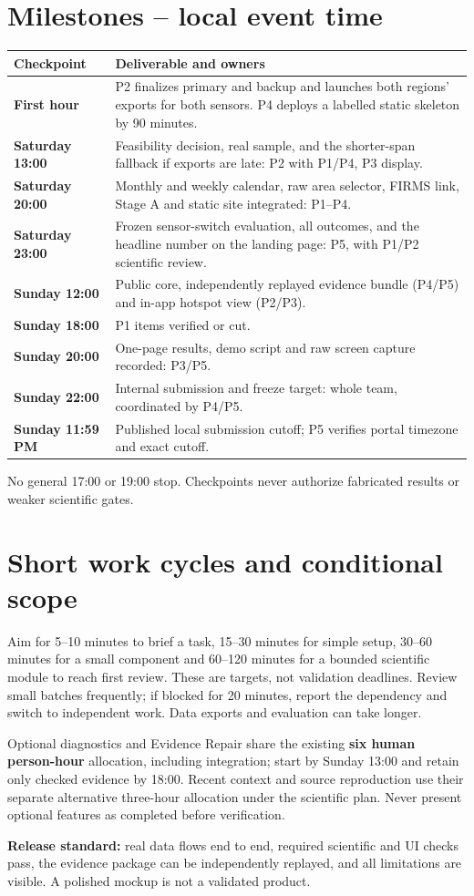 \documentclass[10pt]{article}
\begin{document}
\section*{Milestones -- local event time}
\begin{longtable}{@{}>{\RaggedRight\arraybackslash}p{3.5cm} >{\RaggedRight\arraybackslash}p{12cm}@{}}
\rowcolor{blue!12}\textbf{Checkpoint} & \textbf{Deliverable and owners} \\
\toprule
\textbf{First hour} & P2 finalizes primary and backup and launches both regions' exports for both sensors. P4 deploys a labelled static skeleton by 90 minutes.\\
\textbf{Saturday 13:00} & Feasibility decision, real sample, and the shorter-span fallback if exports are late: P2 with P1/P4, P3 display.\\
\textbf{Saturday 20:00} & Monthly and weekly calendar, raw area selector, FIRMS link, Stage A and static site integrated: P1--P4.\\
\textbf{Saturday 23:00} & Frozen sensor-switch evaluation, all outcomes, and the headline number on the landing page: P5, with P1/P2 scientific review.\\
\textbf{Sunday 12:00} & Public core, independently replayed evidence bundle (P4/P5) and in-app hotspot view (P2/P3).\\
\textbf{Sunday 18:00} & P1 items verified or cut.\\
\textbf{Sunday 20:00} & One-page results, demo script and raw screen capture recorded: P3/P5.\\
\textbf{Sunday 22:00} & Internal submission and freeze target: whole team, coordinated by P4/P5.\\
\textbf{Sunday 11:59 PM} & Published local submission cutoff; P5 verifies portal timezone and exact cutoff.\\
\end{longtable}
No general 17:00 or 19:00 stop. Checkpoints never authorize fabricated results or weaker scientific gates.

\section*{Short work cycles and conditional scope}
Aim for 5--10 minutes to brief a task, 15--30 minutes for simple setup, 30--60 minutes for a small component and 60--120 minutes for a bounded scientific module to reach first review. These are targets, not validation deadlines. Review small batches frequently; if blocked for 20 minutes, report the dependency and switch to independent work. Data exports and evaluation can take longer.

Optional diagnostics and Evidence Repair share the existing \textbf{six human person-hour} allocation, including integration; start by Sunday 13:00 and retain only checked evidence by 18:00. Recent context and source reproduction use their separate alternative three-hour allocation under the scientific plan. Never present optional features as completed before verification.

\textbf{Release standard:} real data flows end to end, required scientific and UI checks pass, the evidence package can be independently replayed, and all limitations are visible. A polished mockup is not a validated product.
\end{document}
